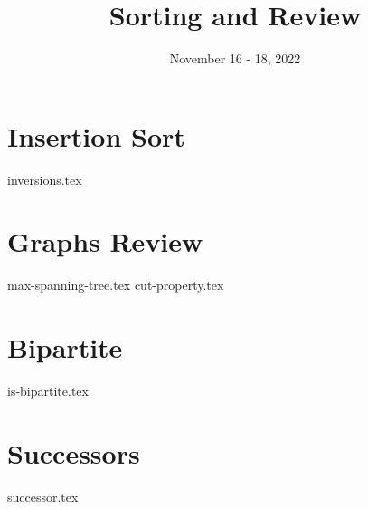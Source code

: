 \documentclass[11pt]{exam}
\title{Sorting and Review}
\date{November 16 - 18, 2022}
\begin{document}
\maketitle

\section{Insertion Sort}
\begin{questions}
{inversions.tex}
\end{questions}

\pagebreak
\section{Graphs Review}
\begin{questions}
{max-spanning-tree.tex}
\pagebreak
{cut-property.tex}
\end{questions}

\pagebreak
\section{Bipartite}
\begin{questions}
{is-bipartite.tex}
\end{questions}

\pagebreak
\section{Successors}
\begin{questions}
{successor.tex}
\end{questions}
\end{document}
